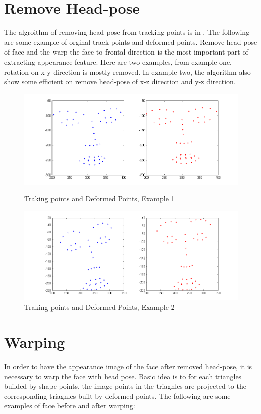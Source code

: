 \section{Remove Head-pose}
The algroithm of removing head-pose from tracking points is in \cite{saragih2011deformable}. The following are some example of orginal track points and deformed points. Remove head pose of face and the warp the face to frontal direction is the most important part of extracting appearance feature. Here are two examples, from example one, rotation on x-y direction is mostly removed. In example two, the algorithm also show some efficient on remove head-pose of x-z direction and y-z direction.
\begin{figure}[ht]
\centering
\includegraphics[width=150mm]{imgs/160954_Deform_213.png}
\caption{Traking points and Deformed Points, Example 1}
\includegraphics[width=150mm]{imgs/160954_Deform_233.png}
\caption{Traking points and Deformed Points, Example 2}
\end{figure}
\newpage
\section{Warping}
In order to have the appearance image of the face after removed head-pose, it is necessary to warp the face with head pose. Basic idea is to for each triangles builded by shape points, the image points in the triagnles are projected to the corresponding triagnles built by deformed points. The following are some examples of face before and after warping:

